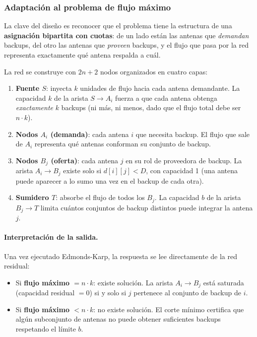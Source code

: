 \subsubsection{Adaptación al problema de flujo máximo}

La clave del diseño es reconocer que el problema tiene la estructura de una \textbf{asignación bipartita con cuotas}: de un lado están las antenas que \textit{demandan} backups, del otro las antenas que \textit{proveen} backups, y el flujo que pasa por la red representa exactamente qué antena respalda a cuál.

La red se construye con $2n + 2$ nodos organizados en cuatro capas:

\begin{enumerate}
    \item \textbf{Fuente $S$}: inyecta $k$ unidades de flujo hacia cada antena demandante. La capacidad $k$ de la arista $S \to A_i$ fuerza a que cada antena obtenga \textit{exactamente} $k$ backups (ni más, ni menos, dado que el flujo total debe ser $n \cdot k$).
    \item \textbf{Nodos $A_i$ (demanda)}: cada antena $i$ que necesita backup. El flujo que sale de $A_i$ representa qué antenas conforman su conjunto de backup.
    \item \textbf{Nodos $B_j$ (oferta)}: cada antena $j$ en su rol de proveedora de backup. La arista $A_i \to B_j$ existe solo si $d[i][j] < D$, con capacidad 1 (una antena puede aparecer a lo sumo una vez en el backup de cada otra).
    \item \textbf{Sumidero $T$}: absorbe el flujo de todos los $B_j$. La capacidad $b$ de la arista $B_j \to T$ limita cuántos conjuntos de backup distintos puede integrar la antena $j$.
\end{enumerate}

\paragraph{Interpretación de la salida.}
Una vez ejecutado Edmonds-Karp, la respuesta se lee directamente de la red residual:

\begin{itemize}
    \item Si \textbf{flujo máximo $= n \cdot k$}: existe solución. La arista $A_i \to B_j$ está saturada (capacidad residual $= 0$) si y solo si $j$ pertenece al conjunto de backup de $i$.
    \item Si \textbf{flujo máximo $< n \cdot k$}: no existe solución. El corte mínimo certifica que algún subconjunto de antenas no puede obtener suficientes backups respetando el límite $b$.
\end{itemize}

